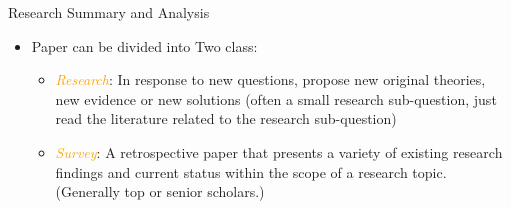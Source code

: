 \documentclass[
 size=14pt,
 paper=smartboard,  %
 mode=present, 		%
 display=slides, 	%
 style=tuliplab,  	%
 pauseslide,
 fleqn,leqno]{powerdot}{}
\begin{document}
\begin{slide}[toc=,bm=]{Research Summary and Analysis}

\begin{itemize}
  \item Paper can be divided into Two class:
  \begin{itemize}
    \item  \textcolor{orange}{\textit{Research}}: In response to new questions, propose new original theories, new evidence or new solutions (often a small research sub-question, just read the literature related to the research sub-question)
    \item  \textcolor{orange}{\textit{Survey}}: A retrospective paper that presents a variety of existing research findings and current status within the scope of a research topic. (Generally top or senior scholars.)
  \end{itemize}
\end{itemize}
\end{slide}
\end{document}

